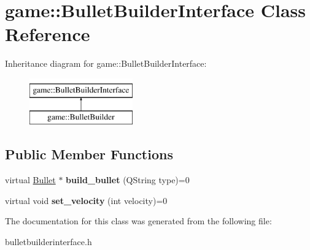 \hypertarget{classgame_1_1BulletBuilderInterface}{}\section{game\+:\+:Bullet\+Builder\+Interface Class Reference}
\label{classgame_1_1BulletBuilderInterface}
Inheritance diagram for game\+:\+:Bullet\+Builder\+Interface\+:\begin{figure}[H]
\begin{center}
\leavevmode
\includegraphics[height=2.000000cm]{classgame_1_1BulletBuilderInterface}
\end{center}
\end{figure}
\subsection*{Public Member Functions}
\begin{DoxyCompactItemize}
\item 
\mbox{\label{classgame_1_1BulletBuilderInterface_a25012860935bc4de6c55cad9490275e9}} 
virtual \hyperlink{classgame_1_1Bullet}{Bullet} $\ast$ {\bfseries build\+\_\+bullet} (Q\+String type)=0
\item 
\mbox{\label{classgame_1_1BulletBuilderInterface_a983cefa4614cd88c453c8761793b43d8}} 
virtual void {\bfseries set\+\_\+velocity} (int velocity)=0
\end{DoxyCompactItemize}


The documentation for this class was generated from the following file\+:\begin{DoxyCompactItemize}
\item 
bulletbuilderinterface.\+h\end{DoxyCompactItemize}

